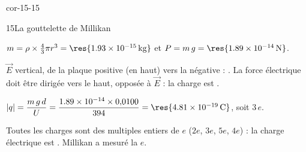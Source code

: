 \begin{blocLivre}{cor-15-15}
\begin{corrige}{15}{La gouttelette de Millikan}
\begin{questions}
\item $m=\rho\times\frac43\pi r^3=\res{\qty{1,93e-15}{kg}}$ et $P=m\,g=\res{\qty{1,89e-14}{N}}$.
\item $\vec{E}$ vertical, de la plaque positive (en haut) vers la négative : . La force électrique
doit être dirigée vers le haut, opposée à $\vec{E}$ : la charge est .
\item $|q|=\dfrac{m\,g\,d}{U}=\dfrac{\num{1.89e-14}\times0{,}0100}{394}=\res{\qty{4,81e-19}{C}}$, soit $3\,e$.
\item Toutes les charges sont des multiples entiers de $e$ ($2e$, $3e$, $5e$, $4e$) : la charge électrique est
. Millikan a mesuré la  $e$.
\end{questions}
\end{corrige}
\end{blocLivre}
